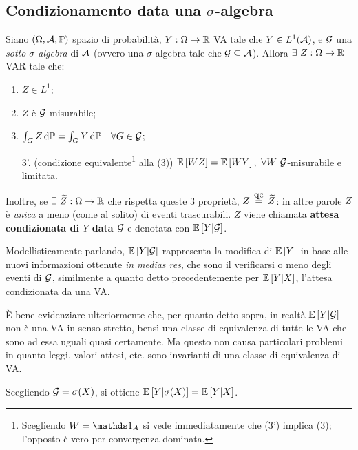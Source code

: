 \subsection{Condizionamento data una $\sigma$-algebra}

\begin{teob}[\JPTh{23.4}]\label{teo-att-cond}
  Siano $(\Omega, \mathcal A, \mathbb P)$ spazio di probabilità, $Y: \Omega \to \mathbb R$ VA tale che $Y \in L^1(\mathcal A)$,
  e $\mathcal G$ una \emph{sotto-$\sigma$-algebra} di $\mathcal A$ (ovvero una $\sigma$-algebra tale che $\mathcal G \subseteq \mathcal A$). Allora $\exists \ Z: \Omega \to \mathbb R$ VAR tale che:
  \begin{enumerate}
    \item $Z \in L^1$;
    \item $Z$ è $\mathcal G$-misurabile;
    \item $\int_G Z \, \mathrm d \mathbb P = \int_G Y \, \mathrm d \mathbb P \quad \forall G \in \mathcal G$;
    \item[3'.] (condizione equivalente\footnote{Scegliendo $W = \Ind_A$ si vede immediatamente che (3') implica (3); l'opposto è vero per convergenza dominata.}
    alla (3)) $\Ex{WZ} = \Ex{WY}, \ \forall W \ \Gc$-misurabile e limitata.
  \end{enumerate}
  Inoltre, se $\exists \ \widetilde Z: \Omega \to \mathbb R$ che rispetta queste 3 proprietà, $Z \aceq \widetilde{Z}$: in altre parole $Z$ è \emph{unica} a meno (come al solito) di eventi trascurabili.
  $Z$ viene chiamata \textbf{attesa condizionata di $Y$ data $\mathcal G$} e denotata con $\mathbb E \left[ Y|\mathcal G \right]$.
\end{teob}
Modellisticamente parlando, $\mathbb E \left[ Y|\mathcal G \right]$ rappresenta la modifica di $\mathbb E \left[ Y \right]$ in base alle nuovi informazioni ottenute \textit{in medias res}, che sono il verificarsi o meno degli eventi di $\mathcal G$, similmente a quanto detto precedentemente per $\mathbb E \left[ Y|X \right]$, l'attesa condizionata da una VA.

È bene evidenziare ulteriormente che, per quanto detto sopra, in realtà $\mathbb E \left[ Y|\mathcal G \right]$ non è una VA in senso stretto, bensì una classe di equivalenza di tutte le VA che sono ad essa uguali quasi certamente. Ma questo non causa particolari problemi in quanto leggi, valori attesi, etc. sono invarianti di una classe di equivalenza di VA.
\begin{nb}
Scegliendo $\mathcal G = \sigma(X)$, si ottiene $\mathbb E \left[ Y|\sigma(X) \right] = \mathbb E \left[ Y|X \right]$.
\end{nb}

